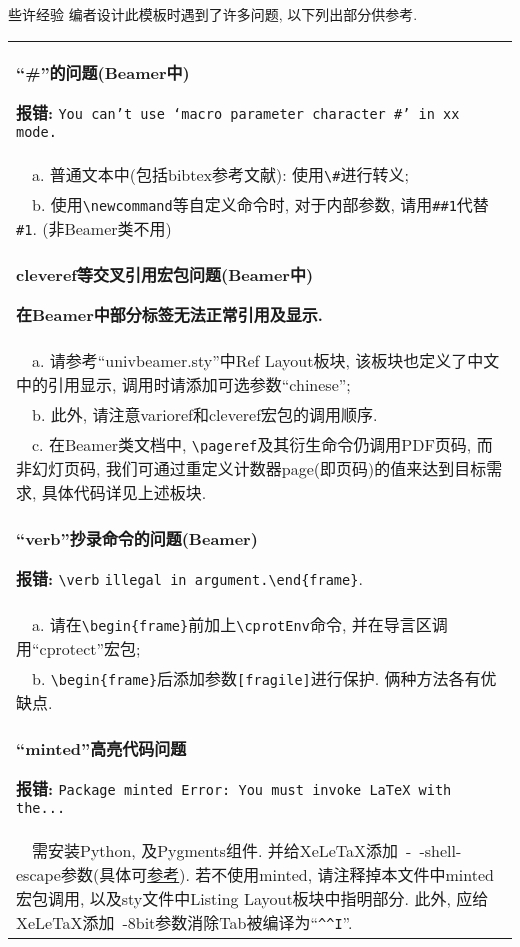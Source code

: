 \documentclass[hyperref, UTF8, CJK, aspectratio=169]{beamer}
\begin{document}
\begin{frame}[fragile]{些许经验}
	\scriptsize
	编者设计此模板时遇到了许多问题, 以下列出部分供参考.
	\begin{table}[h]
		\centering
		\begin{tabular}{>{\raggedright\arraybackslash}p{0.88\paperwidth}}
			\hline\hline
			\centerline{\textbf{``\#''的问题(Beamer中)}}
			\textbf{报错:} \texttt{You can't use `macro parameter character \#' in xx mode.}\\
			~~a. 普通文本中(包括bibtex参考文献): 使用\verb|\#|进行转义; \\
			~~b. 使用\verb|\newcommand|等自定义命令时, 对于内部参数, 请用\verb|##1|代替\verb|#1|. (非Beamer类不用)\\
			\hline
			\centerline{\textbf{cleveref等交叉引用宏包问题(Beamer中)}}
			\textbf{在Beamer中部分标签无法正常引用及显示.}\\
			~~a. 请参考``univbeamer.sty''中Ref Layout板块, 该板块也定义了中文中的引用显示, 调用时请添加可选参数``chinese'';\\
			~~b. 此外, 请注意varioref和cleveref宏包的调用顺序.\\
			~~c. 在Beamer类文档中, \verb|\pageref|及其衍生命令仍调用PDF页码, 而非幻灯页码, 我们可通过重定义计数器page(即页码)的值来达到目标需求, 具体代码详见上述板块.\\%
			\hline
			\centerline{\textbf{``verb''抄录命令的问题(Beamer)}}
			\textbf{报错:} \verb|\verb| \texttt{illegal in argument.}\verb|\end|\verb!{frame}!.\\
			~~a. 请在\verb|\begin|\verb!{frame}!前加上\verb|\cprotEnv|命令, 并在导言区调用``cprotect''宏包;\\
			~~b. \verb|\begin|\verb!{frame}!后添加参数\verb|[fragile]|进行保护. 俩种方法各有优缺点.\\
			\hline
			\centerline{\textbf{``minted''高亮代码问题}}
			\textbf{报错:} \texttt{Package minted Error: You must invoke LaTeX with the...}\\
			~~需安装Python, 及Pygments组件. 并给XeLeTaX添加~-~-shell-escape参数(具体可\href{https://blog.csdn.net/weixin_39679367/article/details/111403418/}{\color{univblue}参考}). 若不使用minted, 请注释掉本文件中minted宏包调用, 以及sty文件中Listing Layout板块中指明部分. 此外, 应给XeLeTaX添加~-8bit参数消除Tab被编译为``\verb|^^I|''.\\
			\hline\hline
		\end{tabular}
	\end{table}
\end{frame}
\end{document}
